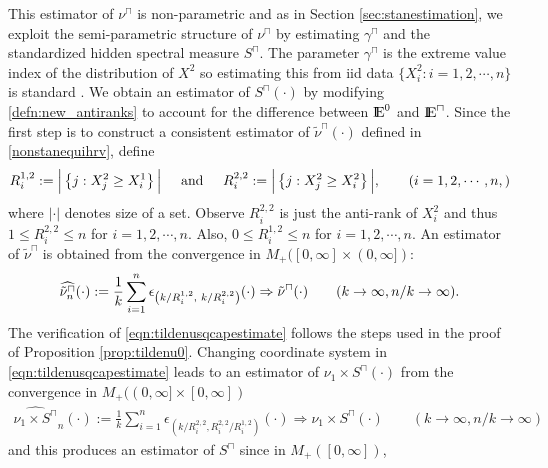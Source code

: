 \documentclass[11 pt]{amsart}
\numberwithin{equation}{section}
\begin{document}
{{This {estimator of $\nu^\sqcap$} is non-parametric and {as} in
Section \ref{sec:stanestimation}, we  exploit the
semi-parametric structure of $\nu^{\sqcap}$ by {estimating}
$\gamma^{\sqcap}$ and the standardized hidden spectral measure
$S^{\sqcap}$. The parameter $\gamma^{\sqcap}$ is the extreme value
index of the distribution of $X^2$ so {e}stimating {this} from  iid data $\{ X^2_i: i = 1, 2,
\cdots, n \}$ is standard \citep[page 65]{dehaan:ferreira:2006}. 
{We obtain an estimator of} 
 $S^{\sqcap}(\cdot)$ by
{modifying \eqref{defn:new_antiranks} to account for the difference
  between ${\mathop{\rm I\kern -0.20em E}\nolimits}^0$ and ${\mathop{\rm I\kern -0.20em E}\nolimits}^\sqcap$}.
{Since the first step is to}
construct a consistent estimator of $\tilde \nu^{\sqcap}(\cdot)$
{defined in \eqref{nonstanequihrv},}
{define}
\begin{align}\label{defn:nonstannew_antiranks}
R^{1, 2}_i : = \Big{|} \left\{ j: X^2_j \ge X^1_i \right\} \Big{|}
\hskip 0.5 cm \hbox{and} \hskip 0.5 cm  R^{2, 2}_i := \Big{|} \left\{
  j: X^2_j \ge X^2_i \right\} \Big{|}, \qquad (i = 1, 2, \cdots,n,)
\end{align}
where $|\cdot |$ denotes size of  a set. {Observe} $R^{2, 2}_i$ is
just the anti-rank of $X^2_i$ and thus
 $1 \le R^{2, 2}_i \le n$ for $i = 1, 2, \cdots, n$.  Also,  $0 \le
 R^{1, 2}_i \le n$ for $i = 1, 2, \cdots, n$. 
{A}n estimator of $\tilde \nu^{\sqcap}$ is obtained from the
convergence in
$M_+([0, \infty] \times (0, \infty])$:
\begin{align}\label{eqn:tildenusqcapestimate}
\widehat{\tilde
\nu_n^{\sqcap}}(\cdot):=
\frac{1}{k} \sum_{i=1}^n \epsilon_{\left(k/R^{1, 2}_i, \hskip 0.1 cm
    k/R^{2, 2}_i \right)}(\cdot) \Rightarrow \tilde
\nu^{\sqcap}(\cdot) \qquad (k \to \infty, n/k \to \infty).
\end{align}
{The verification of \eqref{eqn:tildenusqcapestimate} follows the steps
used in the proof of Proposition \ref{prop:tildenu0}.}
{Changing coordinate system in \eqref{eqn:tildenusqcapestimate} leads
to an estimator of }
 $\nu_1 \times  S^{\sqcap}(\cdot)$ from the convergence
{in $M_+((0, \infty] \times [0, \infty])$}
\begin{align}\label{eqn:tildenusqcapdecompestimate}
\widehat{\nu_1 \times  S^{\sqcap}}_n(\cdot):=
\frac{1}{k} \sum_{i=1}^n \epsilon_{\left({k}/{ R^{2, 2}_i} ,
   {R^{2, 2}_i}/{R^{1, 2}_i} \right)}(\cdot) \Rightarrow \nu_1
\times  S^{\sqcap}(\cdot) \qquad (k \to \infty, n/k \to \infty)
\end{align}
and this produces an estimator of $S^\sqcap$ since {i}n $M_+([0, \infty])$,
}}
\end{document}

